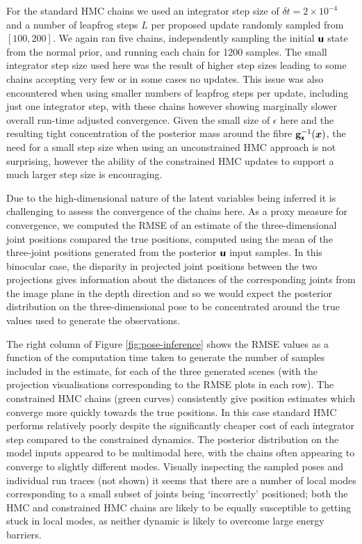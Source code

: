For the standard \ac{HMC} chains we used an integrator step size of $\delta t = 2 \times 10^{-4}$ and a number of leapfrog steps $L$ per proposed update randomly sampled from $[100,200]$. We again ran five chains, independently sampling the initial $\boldsymbol{\mathsf{u}}$ state from the normal prior, and running each chain for 1200 samples. The small integrator step size used here was the result of higher step sizes leading to some chains accepting very few or in some cases no updates. This issue was also encountered when using smaller numbers of leapfrog steps per update, including just one integrator step, with these chains however showing marginally slower overall run-time adjusted convergence. Given the small size of $\epsilon$ here and the resulting tight concentration of the posterior mass around the fibre ${\mathbf{g}}_{\boldsymbol{\mathsf{x}}}^{-1}(\boldsymbol{x})$, the need for a small step size when using an unconstrained \ac{HMC} approach is not surprising, however the ability of the constrained \ac{HMC} updates to support a much larger step size is encouraging. %

Due to the high-dimensional nature of the latent variables being inferred it is challenging to assess the convergence of the chains here. As a proxy measure for convergence, we computed the \ac{RMSE} of an estimate of the three-dimensional joint positions compared the true positions, computed using the mean of the three-joint positions generated from the posterior $\boldsymbol{\mathsf{u}}$ input samples. In this binocular case, the disparity in projected joint positions between the two projections gives information about the distances of the corresponding joints from the image plane in the depth direction and so we would expect the posterior distribution on the three-dimensional pose to be concentrated around the true values used to generate the observations.

The right column of Figure \ref{fig:pose-inference} shows the \ac{RMSE} values as a function of the computation time taken to generate the number of samples included in the estimate, for each of the three generated scenes (with the projection visualisations corresponding to the \ac{RMSE} plots in each row). The constrained \ac{HMC} chains (green curves) consistently give position estimates which converge more quickly towards the true positions. In this case standard \ac{HMC} performs relatively poorly despite the significantly cheaper cost of each integrator step compared to the constrained dynamics. The posterior distribution on the model inputs appeared to be multimodal here, with the chains often appearing to converge to slightly different modes. Visually inspecting the sampled poses and individual run traces (not shown) it seems that there are a number of local modes corresponding to a small subset of joints being `incorrectly' positioned; both the \ac{HMC} and constrained \ac{HMC} chains are likely to be equally susceptible to getting stuck in local modes, as neither dynamic is likely to overcome large energy barriers. %


